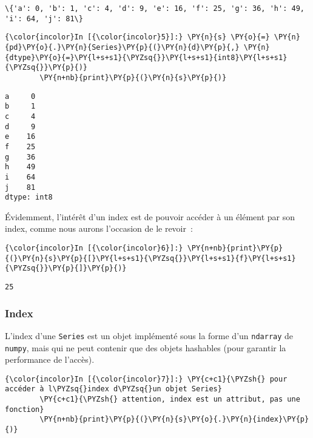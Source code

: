     \begin{Verbatim}[commandchars=\\\{\}]
\{'a': 0, 'b': 1, 'c': 4, 'd': 9, 'e': 16, 'f': 25, 'g': 36, 'h': 49, 'i': 64, 'j': 81\}

    \end{Verbatim}

    \begin{Verbatim}[commandchars=\\\{\}]
{\color{incolor}In [{\color{incolor}5}]:} \PY{n}{s} \PY{o}{=} \PY{n}{pd}\PY{o}{.}\PY{n}{Series}\PY{p}{(}\PY{n}{d}\PY{p}{,} \PY{n}{dtype}\PY{o}{=}\PY{l+s+s1}{\PYZsq{}}\PY{l+s+s1}{int8}\PY{l+s+s1}{\PYZsq{}}\PY{p}{)}
        \PY{n+nb}{print}\PY{p}{(}\PY{n}{s}\PY{p}{)}
\end{Verbatim}


    \begin{Verbatim}[commandchars=\\\{\}]
a     0
b     1
c     4
d     9
e    16
f    25
g    36
h    49
i    64
j    81
dtype: int8

    \end{Verbatim}

    Évidemment, l'intérêt d'un index est de pouvoir accéder à un élément par
son index, comme nous aurons l'occasion de le revoir~:

    \begin{Verbatim}[commandchars=\\\{\}]
{\color{incolor}In [{\color{incolor}6}]:} \PY{n+nb}{print}\PY{p}{(}\PY{n}{s}\PY{p}{[}\PY{l+s+s1}{\PYZsq{}}\PY{l+s+s1}{f}\PY{l+s+s1}{\PYZsq{}}\PY{p}{]}\PY{p}{)}
\end{Verbatim}


    \begin{Verbatim}[commandchars=\\\{\}]
25

    \end{Verbatim}

    \hypertarget{index}{%
\subsubsection{Index}\label{index}}

    L'index d'une \texttt{Series} est un objet implémenté sous la forme d'un
\texttt{ndarray} de \texttt{numpy}, mais qui ne peut contenir que des
objets hashables (pour garantir la performance de l'accès).

    \begin{Verbatim}[commandchars=\\\{\}]
{\color{incolor}In [{\color{incolor}7}]:} \PY{c+c1}{\PYZsh{} pour accéder à l\PYZsq{}index d\PYZsq{}un objet Series}
        \PY{c+c1}{\PYZsh{} attention, index est un attribut, pas une fonction}
        \PY{n+nb}{print}\PY{p}{(}\PY{n}{s}\PY{o}{.}\PY{n}{index}\PY{p}{)}
\end{Verbatim}


